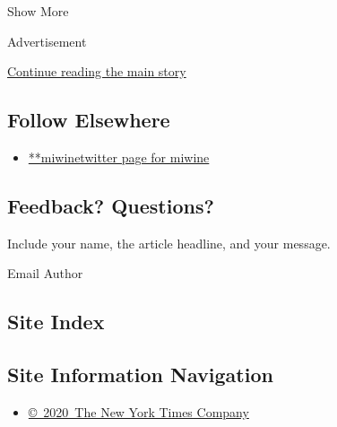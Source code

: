 Show More

Advertisement

\protect\hyperlink{after-mid2}{Continue reading the main story}

\hypertarget{follow-elsewhere}{%
\subsection{Follow Elsewhere}\label{follow-elsewhere}}

\begin{itemize}
\tightlist
\item
  \href{https://twitter.com/miwine}{**miwinetwitter page for miwine}
\end{itemize}

\hypertarget{feedback-questions}{%
\subsection{Feedback? Questions?}\label{feedback-questions}}

Include your name, the article headline, and your message.

Email Author

\hypertarget{site-index}{%
\subsection{Site Index}\label{site-index}}

\hypertarget{site-information-navigation}{%
\subsection{Site Information
Navigation}\label{site-information-navigation}}

\begin{itemize}
\tightlist
\item
  \href{https://help.nytimes3xbfgragh.onion/hc/en-us/articles/115014792127-Copyright-notice}{©~2020~The
  New York Times Company}
\end{itemize}

